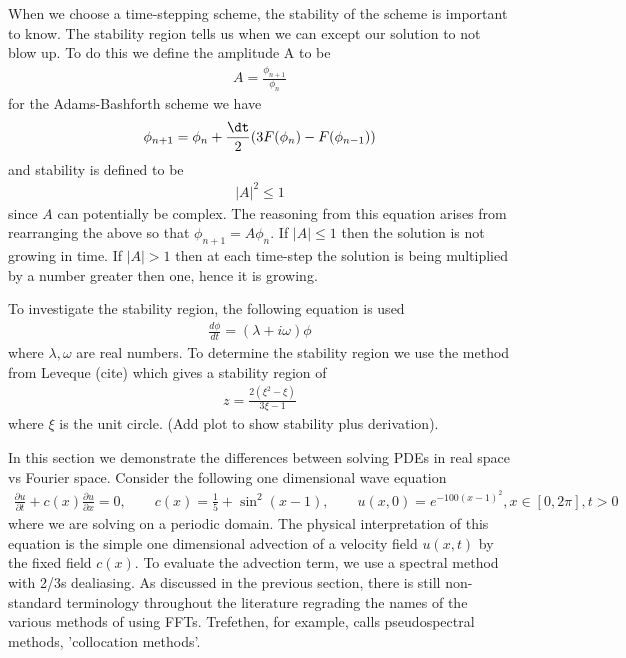 When we choose a time-stepping scheme, the stability of the scheme is important to know. The stability region tells us when we can except our solution to not blow up. To do this we define the amplitude A to be
\begin{align}
A = \frac{\phi_{n+1}}{\phi_{n}}
\end{align}
for the Adams-Bashforth scheme we have 
\begin{align}
\phi_{n+1} = \phi_{n} + \frac{\dt}{2}(3F(\phi_{n}) - F(\phi_{n-1}))
\end{align}
and stability is defined to be 
\begin{align}
|A|^{2} \le 1
\end{align}
since $A$ can potentially be complex. The reasoning from this equation arises from rearranging the above so that $\phi_{n+1}=A\phi_{n}$. If $|A|\le 1$ then the solution is not growing in time. If $|A|>1$ then at each time-step the solution is being multiplied by a number greater then one, hence it is growing. 

To investigate the stability region, the following equation is used\cite{durran}
\begin{align}
\frac{d\phi}{dt} =  (\lambda + i\omega)\phi
\end{align}
where $\lambda,\omega$ are real numbers. To determine the stability region we use the method from Leveque (cite) which gives a stability region of
\begin{align}
z = \frac{2(\xi^{2}-\xi)}{3\xi -1}
\end{align}
where $\xi$ is the unit circle. (Add plot to show stability plus derivation).

In this section we demonstrate the differences between solving PDEs in real space vs Fourier space. Consider the following one dimensional wave equation\cite{trefethen_spectral}
\begin{align}
\frac{\partial u}{\partial t} + c(x)\frac{\partial u}{\partial x} = 0,\qquad c(x)=\frac{1}{5}+\sin^{2}(x-1), \qquad u(x,0)=e^{-100(x-1)^{2}}, x\in[0,2\pi], t>0
\end{align}
where we are solving on a periodic domain. The physical interpretation of this equation is the simple one dimensional advection of a velocity field $u(x,t)$ by the fixed field $c(x)$. To evaluate the advection term, we use a spectral method with 2/3s dealiasing. As discussed in the previous section, there is still non-standard terminology throughout the literature regrading the names of the various methods of using FFTs. Trefethen, for example, calls pseudospectral methods, 'collocation methods'. 

